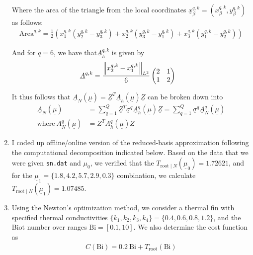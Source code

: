 \begin{enumerate}[label=(\alph*),leftmargin=*,itemsep=0mm]
    Where the area of the triangle from the local coordinates $\underline{x}^{q,k}_\beta = (x^{q,k}_\beta,y^{q,k}_\beta)$ as follows:
    \begin{align}
        \text{Area}^{q,k} = \frac{1}{2}(x_1^{q,k}(y_2^{q,k}-y_3^{q,k})
        + x_2^{q,k}(y_3^{q,k}-y_1^{q,k}) + x_3^{q,k}(y_1^{q,k}-y_2^{q,k}))
    \end{align}
    
    And for $q=6$, we have that$\underline{A}_h^{q,k}$ is given by
    \begin{align}
        \underline{A}^{q,k} &= \frac{\norm{x_2^{q,k}-x_1^{q,k}}_{L^2}}{6}
        \begin{pmatrix} 2 & 1 \\ 1 & 2 \end{pmatrix}
    \end{align}
    
    It thus follows that $\underline{A}_N(\underline{\mu}) = \underline{Z}^T \underline{A}_h(\underline{\mu}) \underline{Z}$ can be broken down into
    \begin{align}
        \underline{A}_N(\underline{\mu}) &= \sum_{q=1}^Q \underline{Z}^T \underline{\sigma}^q \underline{A}_h^q(\underline{\mu}) \underline{Z}
        = \sum_{q=1}^Q \underline{\sigma}^q \underline{A}_N^q(\underline{\mu}) \\
        \text{where}\> \underline{A}_N^q(\underline{\mu})
        &= \underline{Z}^T \underline{A}_h^q(\underline{\mu}) \underline{Z}
    \end{align}
    
    \item I coded up offline/online version of the reduced-basis approximation following the computational decomposition indicated below.  Based on the data that we were given \texttt{sn.dat} and $\mu_0$, we verified that the $T_{\text{root}\mid N}(\underline{\mu}_0) = 1.72621$, and for the $\underline{\mu}_1 = \{1.8,4.2,5.7,2.9,0.3\}$ combination, we calculate $T_{\text{root}\mid N}(\underline{\mu}_1) = 1.07485$.
    
    \item Using the Newton's optimization method, we consider a thermal fin with specified thermal conductivities $\{k_1,k_2,k_3,k_4\} = \{0.4,0.6,0.8,1.2\}$, and the Biot number over ranges $\text{Bi} = [0.1,10]$.  We also determine the cost function as
    \begin{align}
        C(\text{Bi}) = 0.2\>\text{Bi} + T_\text{root}(\text{Bi})
    \end{align}
    

\end{enumerate}
